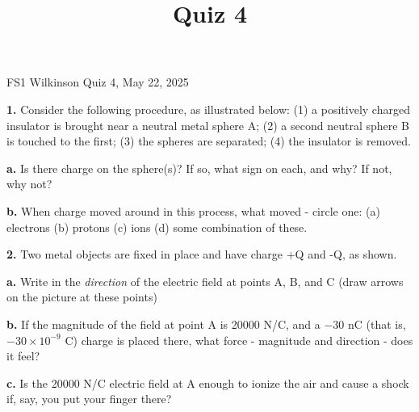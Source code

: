 \documentclass[12pt]{article}
\title{Quiz 4}
\begin{document}
\setlength{\parindent}{0pt}
\setlength{\parskip}{3mm}

FS1 Wilkinson Quiz 4, May 22, 2025

\textbf{1.} Consider the following procedure, as illustrated below: (1) a positively charged insulator is brought near a neutral metal sphere A; (2) a second neutral sphere B is touched to the first; (3) the spheres are separated; (4) the insulator is removed.

\vspace{1in}

\textbf{a.} Is there charge on the sphere(s)? If so, what sign on each, and why? If not, why not?
\vspace{1.5in}

\textbf{b.} When charge moved around in this process, what moved - circle one: 
(a) electrons
(b) protons
(c) ions
(d) some combination of these.

\bigskip

\textbf{2.} Two metal objects are fixed in place and have charge +Q and -Q, as shown.
\vspace{1.75in}

\textbf{a.} Write in the \textit{direction} of the electric field at points A, B, and C (draw arrows on the picture at these points)

\textbf{b.} If the magnitude of the field at point A is 20000 N/C, and a $-30$ nC (that is, $-30 \times 10^{-9}$ C) charge is placed there, what force - magnitude and direction - does it feel?

\vspace{1 in}

\textbf{c.} Is the 20000 N/C electric field at A enough to ionize the air and cause a shock if, say, you put your finger there?
\end{document}
